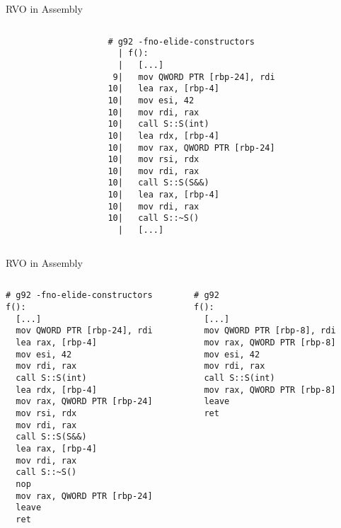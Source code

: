 \begin{frame}[fragile]{RVO in Assembly}
    \begin{columns}[t]
        \begin{column}{.45\textwidth}
        \end{column}
        \begin{column}{.45\textwidth}
            \begin{lstlisting}[language={},morekeywords={rdi},numbers=none]
# g92 -fno-elide-constructors
  | f():
  |   [...]
 9|   mov QWORD PTR [rbp-24], rdi
10|   lea rax, [rbp-4]
10|   mov esi, 42
10|   mov rdi, rax
10|   call S::S(int)
10|   lea rdx, [rbp-4]
10|   mov rax, QWORD PTR [rbp-24]
10|   mov rsi, rdx
10|   mov rdi, rax
10|   call S::S(S&&)
10|   lea rax, [rbp-4]
10|   mov rdi, rax
10|   call S::~S()
  |   [...]      
            \end{lstlisting}
        \end{column}
    \end{columns}
\end{frame}

\begin{frame}[fragile]{RVO in Assembly}
    \begin{columns}[t]
        \begin{column}{.45\textwidth}
            \begin{lstlisting}[language={},morekeywords={rdi}]
# g92 -fno-elide-constructors
f():
  [...]
  mov QWORD PTR [rbp-24], rdi
  lea rax, [rbp-4]
  mov esi, 42
  mov rdi, rax
  call S::S(int)
  lea rdx, [rbp-4]
  mov rax, QWORD PTR [rbp-24]
  mov rsi, rdx
  mov rdi, rax
  call S::S(S&&)
  lea rax, [rbp-4]
  mov rdi, rax
  call S::~S()
  nop
  mov rax, QWORD PTR [rbp-24]
  leave
  ret
            \end{lstlisting}
        \end{column}
        \begin{column}{.45\textwidth}
            \begin{lstlisting}[language={},morekeywords={rdi}]
# g92
f():
  [...]
  mov QWORD PTR [rbp-8], rdi
  mov rax, QWORD PTR [rbp-8]
  mov esi, 42
  mov rdi, rax
  call S::S(int)
  mov rax, QWORD PTR [rbp-8]
  leave
  ret
            \end{lstlisting}
        \end{column}
    \end{columns}
\end{frame}

